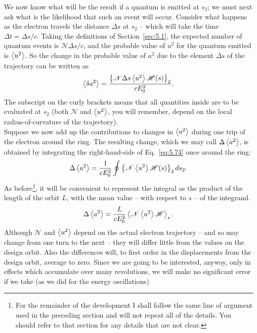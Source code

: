 \documentclass[../sands-adaptation.tex]{subfiles}
\begin{document}
We now know what will be the result if a quantum is emitted at $s_2$; we must next ask what is the likelihood that such an event will occur. Consider what happens as the electron travels the distance $\Delta s$ at $s_2$ -- which will take the time $\Delta t = \Delta s/c$. Taking the definitions of Section~\ref{sec:5.1}, the expected number of quantum events is $\mathscr{N}\Delta s/c$, and the probable value of $u^2$ for the quantum emitted is $\left< u^2 \right>$. So the change in the probable value of $a^2$ due to the element $\Delta s$ of the trajectory
 can be written as
\begin{align} \label{eq:5.74}
	\left< \delta a^2 \right> = \dfrac{\left\lbrace \mathscr{N} \Delta s \left< u^2 \right> \mathscr{H}(s) \right\rbrace_2}{c E_0^2}.
\end{align}
The subscript on the curly brackets means that all quantities inside are to be evaluated at $s_2$ (both $\mathscr{N}$ and $\left< u^2 \right>$, you will remember, depend on the local radius-of-curvature of the trajectory).\\
Suppose we now add up the contributions to changes in $\left< a^2 \right>$ during one trip of the electron around the ring. The resulting change, which we may call $\Delta \left< a^2 \right>$, is obtained by integrating the right-hand-side of Eq.~\eqref{eq:5.74} once around the ring:
\begin{align}
	\Delta \left< a^2 \right> = \dfrac{1}{c E_0^2} \oint \left\lbrace \mathscr{N} \left< u^2 \right> \mathscr{H}(s) \right\rbrace_2 ds_2.
\end{align}
As before\footnote{For the remainder of the development I shall follow the same line of argument used in the preceding section and will not repeat all of the details. You should refer to
that section for any details that are not clear.}, it will be convenient to represent the integral as the product of the length of the orbit $L$, with the mean value -- with respect to $s$ -- of the integrand.
\begin{align}\label{eq:5.76}
	\Delta \left< a^2 \right> = \dfrac{L}{c E_0^2} \left< \mathscr{N}\left< u^2 \right>\mathscr{H} \right>_s.
\end{align}
Although $\mathscr{N}$ and $\left< u^2 \right>$ depend on the actual electron trajectory -- and so may change from one turn to the next -- they will differ little from the values on the design orbit.
 Also the differences will, to first order in the displacements from the design orbit, average to zero. Since we are going to be interested, anyway, only in effects which accumulate over many revolutions, we will make no significant error if we take (as we did for the energy oscillations)
\end{document}
